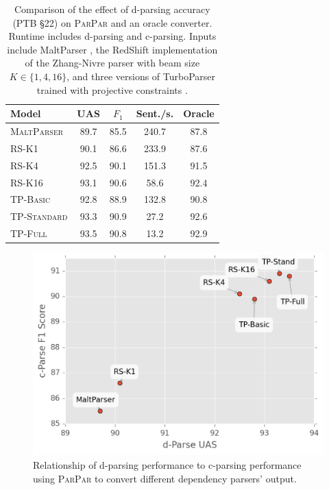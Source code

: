 \documentclass[11pt,letterpaper]{article}
\newcommand{\ParseName}{\textsc{ParPar}\xspace}
\begin{document}
\begin{table}
  \centering
  \small

  \begin{tabular}{|l|cccc|}
    \hline
    Model & UAS  & $F_1$ & Sent./s.  & Oracle  \\
    \hline

    \hline
    \textsc{MaltParser}  & 89.7 & 85.5 & 240.7& 87.8 \\
    \textsc{RS-K1}       & 90.1 & 86.6 & 233.9& 87.6 \\
    \textsc{RS-K4}       & 92.5 & 90.1 & 151.3& 91.5 \\
    \textsc{RS-K16}      & 93.1 & 90.6 & 58.6 & 92.4 \\
    \textsc{TP-Basic}    & 92.8 & 88.9 & 132.8& 90.8 \\
    \textsc{TP-Standard} & 93.3 & 90.9 & 27.2 & 92.6 \\
    \textsc{TP-Full}     & 93.5 & 90.8 & 13.2 & 92.9 \\
    \hline
  \end{tabular}


  
  \caption{Comparison of the effect of d-parsing accuracy (PTB \S 22)
    on \ParseName{} and an oracle converter.  Runtime includes
    d-parsing and c-parsing.  
    Inputs include 
 MaltParser \cite{nivre2006maltparser}, 
    the RedShift implementation of the Zhang-Nivre parser
    \cite{zhang2011transition} with beam size $K \in \{1, 4, 16\}$,
and three versions of TurboParser trained with projective constraints
    \cite{martins2013turning}.
\label{tab:oracle} }
\end{table}

\begin{figure}
  \centering
  \includegraphics[scale=0.5]{../notebooks/parsers}
\caption{\label{fig:corr} Relationship of d-parsing performance to
  c-parsing performance using \ParseName to convert different
  dependency parsers' output.}
\end{figure}
\end{document}
